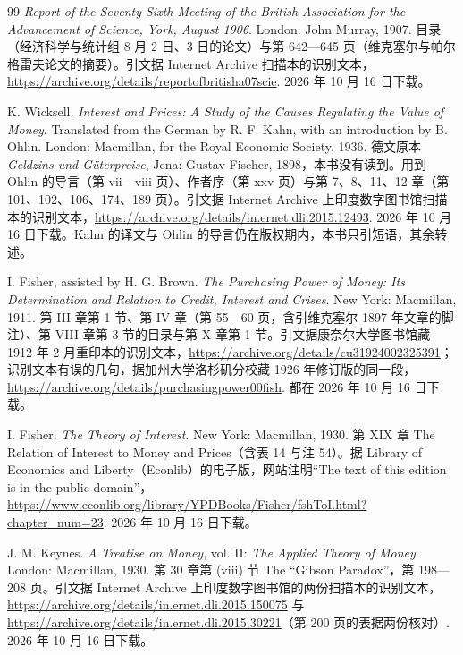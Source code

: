 \begin{thebibliography}{99}
 \emph{Report of the Seventy-Sixth Meeting of the British Association for the Advancement of Science, York, August 1906}. London: John Murray, 1907. 目录（经济科学与统计组 8 月 2 日、3 日的论文）与第 642—645 页（维克塞尔与帕尔格雷夫论文的摘要）。引文据 Internet Archive 扫描本的识别文本，\url{https://archive.org/details/reportofbritisha07scie}. 2026 年 10 月 16 日下载。

 K. Wicksell. \emph{Interest and Prices: A Study of the Causes Regulating the Value of Money}. Translated from the German by R. F. Kahn, with an introduction by B. Ohlin. London: Macmillan, for the Royal Economic Society, 1936. 德文原本 \emph{Geldzins und Güterpreise}, Jena: Gustav Fischer, 1898，本书没有读到。用到 Ohlin 的导言（第 vii—viii 页）、作者序（第 xxv 页）与第 7、8、11、12 章（第 101、102、106、174、189 页）。引文据 Internet Archive 上印度数字图书馆扫描本的识别文本，\url{https://archive.org/details/in.ernet.dli.2015.12493}. 2026 年 10 月 16 日下载。Kahn 的译文与 Ohlin 的导言仍在版权期内，本书只引短语，其余转述。

 I. Fisher, assisted by H. G. Brown. \emph{The Purchasing Power of Money: Its Determination and Relation to Credit, Interest and Crises}. New York: Macmillan, 1911. 第 III 章第 1 节、第 IV 章（第 55—60 页，含引维克塞尔 1897 年文章的脚注）、第 VIII 章第 3 节的目录与第 X 章第 1 节。引文据康奈尔大学图书馆藏 1912 年 2 月重印本的识别文本，\url{https://archive.org/details/cu31924002325391}；识别文本有误的几句，据加州大学洛杉矶分校藏 1926 年修订版的同一段，\url{https://archive.org/details/purchasingpower00fish}. 都在 2026 年 10 月 16 日下载。

 I. Fisher. \emph{The Theory of Interest}. New York: Macmillan, 1930. 第 XIX 章 The Relation of Interest to Money and Prices（含表 14 与注 54）。据 Library of Economics and Liberty（Econlib）的电子版，网站注明“The text of this edition is in the public domain”，\url{https://www.econlib.org/library/YPDBooks/Fisher/fshToI.html?chapter_num=23}. 2026 年 10 月 16 日下载。

 J. M. Keynes. \emph{A Treatise on Money}, vol. II: \emph{The Applied Theory of Money}. London: Macmillan, 1930. 第 30 章第 (viii) 节 The ``Gibson Paradox''，第 198—208 页。引文据 Internet Archive 上印度数字图书馆的两份扫描本的识别文本，\url{https://archive.org/details/in.ernet.dli.2015.150075} 与 \url{https://archive.org/details/in.ernet.dli.2015.30221}（第 200 页的表据两份核对）. 2026 年 10 月 16 日下载。


\end{thebibliography}
